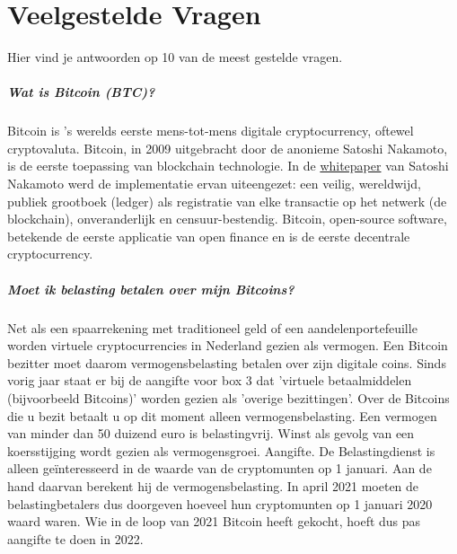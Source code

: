 \chapter{Veelgestelde Vragen}
\label{ch:FAQ}
Hier vind je antwoorden op 10 van de meest gestelde vragen.

\paragraph{Wat is Bitcoin (BTC)?} Bitcoin is 's werelds eerste mens-tot-mens digitale cryptocurrency, oftewel cryptovaluta. Bitcoin, in 2009 uitgebracht door de anonieme Satoshi Nakamoto, is de eerste toepassing van blockchain technologie. In de \href{https://bitcoin.org/bitcoin.pdf}{whitepaper} van Satoshi Nakamoto werd de implementatie ervan uiteengezet: een veilig, wereldwijd, publiek grootboek (ledger) als registratie van elke transactie op het netwerk (de blockchain), onveranderlijk en censuur-bestendig. Bitcoin, open-source software, betekende de eerste applicatie van open finance en is de eerste decentrale cryptocurrency.


\paragraph{Moet ik belasting betalen over mijn Bitcoins?}
Net als een spaarrekening met traditioneel geld of een aandelenportefeuille worden virtuele cryptocurrencies in Nederland gezien als vermogen. Een Bitcoin bezitter moet daarom vermogensbelasting betalen over zijn digitale coins. Sinds vorig jaar staat er bij de aangifte voor box 3 dat 'virtuele betaalmiddelen (bijvoorbeeld Bitcoins)' worden gezien als 'overige bezittingen'.
Over de Bitcoins die u bezit betaalt u op dit moment alleen vermogensbelasting. Een vermogen van minder dan 50 duizend euro is belastingvrij. Winst als gevolg van een koersstijging wordt gezien als vermogensgroei. \medskip
Aangifte. De Belastingdienst is alleen ge{\"i}nteresseerd in de waarde van de cryptomunten op 1 januari. Aan de hand daarvan berekent hij de vermogensbelasting. In april 2021 moeten de belastingbetalers dus doorgeven hoeveel hun cryptomunten op 1 januari 2020 waard waren. Wie in de loop van 2021 Bitcoin heeft gekocht, hoeft dus pas aangifte te doen in 2022.

